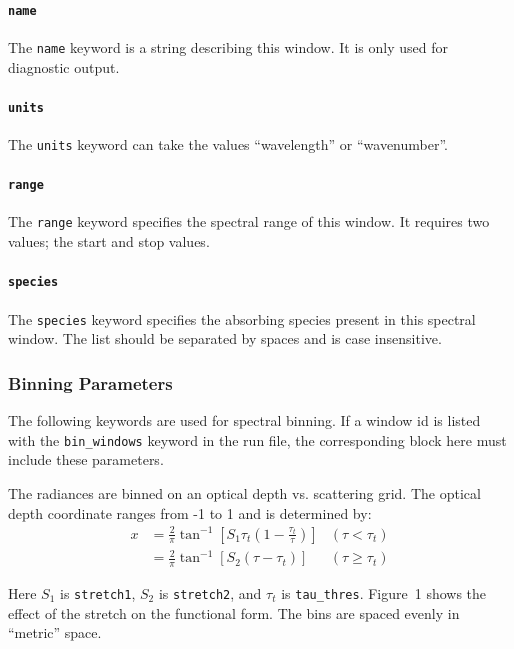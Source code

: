 \documentclass{article}
\begin{document}
\paragraph{\texttt{name}}

The \texttt{name} keyword is a string describing this window.  It is
only used for diagnostic output.

\paragraph{\texttt{units}}

The \texttt{units} keyword can take the values ``wavelength'' or
``wavenumber''. 

\paragraph{\texttt{range}}

The \texttt{range} keyword specifies the spectral range of this
window.  It requires two values; the start and stop values.

\paragraph{\texttt{species}}

The \texttt{species} keyword specifies the absorbing species present
in this spectral window.  The list should be separated by spaces and
is case insensitive.

\subsubsection{Binning Parameters}
The following keywords are used for spectral binning.  If a window id
is listed with the \texttt{bin\_windows} keyword in the run file, the
corresponding block here must include these parameters.

The radiances are binned on an optical depth vs. scattering grid.  The
optical depth coordinate ranges from -1 to 1 and is determined by:
\begin{align*}
  x &= \frac{2}{\pi}\tan^{-1}[S_1\tau_t(1-\frac{\tau_t}{\tau})] & (\tau < \tau_t)\\
    &= \frac{2}{\pi}\tan^{-1}[S_2(\tau-\tau_t)] & (\tau \ge \tau_t)
\end{align*}

Here $S_1$ is \texttt{stretch1}, $S_2$ is \texttt{stretch2}, and
$\tau_t$ is \texttt{tau\_thres}.  Figure~1 shows the effect of the
stretch on the functional form.  The bins are spaced evenly in
``metric'' space.
\end{document}
